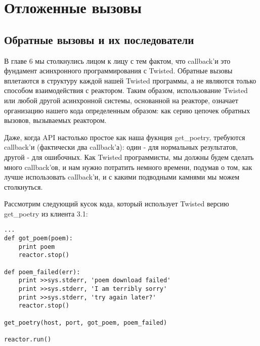 

\section{Отложенные вызовы\label{sec:part7}}

\subsection{Обратные вызовы и их последователи}

В главе 6 мы столкнулись лицом к лицу с тем фактом, что 
callback'и это фундамент асинхронного программирования с Twisted. 
Обратные вызовы вплетаются в структуру каждой нашей 
Twisted программы, а не являются только способом взаимодействия с 
реактором. Таким образом, использование Twisted 
или любой другой асинхронной системы, основанной на реакторе, 
означает организацию нашего кода определенным образом: 
как серию цепочек обратных вызовов, вызываемых реактором.
 

Даже, когда API настолько простое как наша фукнция get\_poetry, 
требуются callback'и (фактически два callback'а): один - для нормальных 
результатов, другой - для ошибочных. Как Twisted программисты, 
мы должны будем сделать много callback'ов, и нам нужно потратить 
немного времени, подумав о том, как лучше использовать callback'и, и 
с какими подводными камнями мы можем столкнуться.


Рассмотрим следующий кусок кода, который использует 
Twisted версию get\_poetry из клиента 3.1:

 \begin{verbatim}
...
def got_poem(poem):
    print poem
    reactor.stop()

def poem_failed(err):
    print >>sys.stderr, 'poem download failed'
    print >>sys.stderr, 'I am terribly sorry'
    print >>sys.stderr, 'try again later?'
    reactor.stop()

get_poetry(host, port, got_poem, poem_failed)

reactor.run()
\end{verbatim} 

